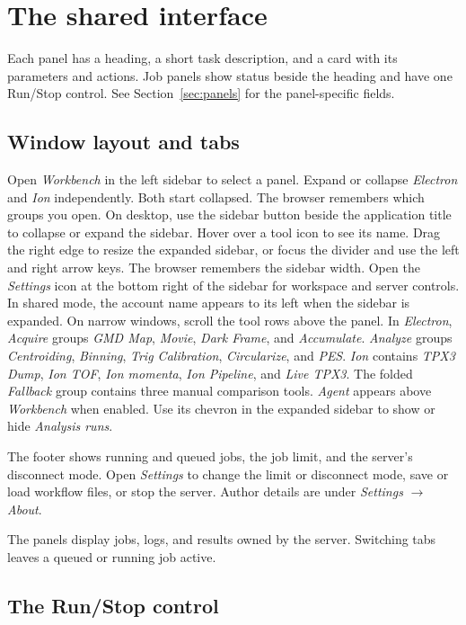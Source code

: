 \documentclass[11pt,a4paper]{article}
\begin{document}
\section{The shared interface}
\label{sec:shared}

Each panel has a heading, a short task description, and a card with its
parameters and actions. Job panels show status beside the heading and have
one Run/Stop control. See Section~\ref{sec:panels} for the panel-specific fields.

\subsection{Window layout and tabs}
\label{sec:tabs}

Open \emph{Workbench} in the left sidebar to select a panel. Expand or
collapse \emph{Electron} and \emph{Ion} independently. Both start collapsed.
The browser remembers which groups you open.
On desktop, use the sidebar button beside the application title to collapse
or expand the sidebar. Hover over a tool icon to see its name. Drag the right
edge to resize the expanded sidebar, or focus the divider and use the left
and right arrow keys. The browser remembers the sidebar width.
Open the \emph{Settings} icon at the bottom right of the sidebar for workspace
and server controls. In shared mode, the account name appears to its left
when the sidebar is expanded.
On narrow windows, scroll the tool rows above the panel.
In \emph{Electron}, \emph{Acquire} groups \emph{GMD Map}, \emph{Movie},
\emph{Dark Frame}, and \emph{Accumulate}. \emph{Analyze} groups
\emph{Centroiding}, \emph{Binning}, \emph{Trig Calibration},
\emph{Circularize}, and \emph{PES}.
\emph{Ion} contains \emph{TPX3 Dump}, \emph{Ion TOF}, \emph{Ion momenta},
\emph{Ion Pipeline}, and \emph{Live TPX3}. The folded \emph{Fallback} group
contains three manual comparison tools. \emph{Agent} appears above
\emph{Workbench} when enabled. Use its chevron in the expanded sidebar to
show or hide \emph{Analysis runs}.

The footer shows running and queued jobs, the job limit, and the server's
disconnect mode. Open \emph{Settings} to change the limit or disconnect mode,
save or load workflow files, or stop the server. Author details are under
\emph{Settings} $\rightarrow$ \emph{About}.

The panels display jobs, logs, and results owned by the server. Switching
tabs leaves a queued or running job active.

\subsection{The Run/Stop control}
\label{sec:runstop}
\end{document}
